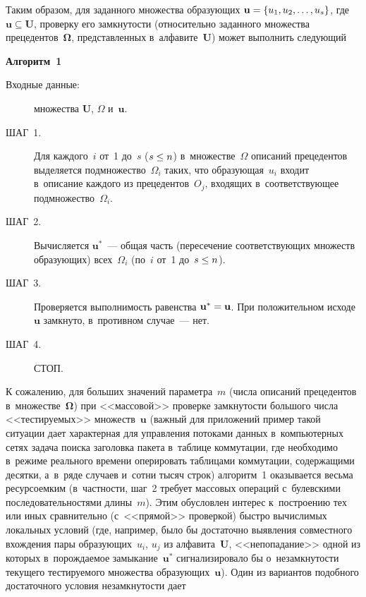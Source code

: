 \begin{multicols}{2}
    Таким образом, для заданного множества образующих 
$\mathbf{u}\hm= \{u_1, u_2, \ldots, u_s\}$, где $\mathbf{u}\subseteq 
\mathbf{U}$, проверку его замкнутости (относительно заданного 
множества прецедентов~$\boldsymbol{\Omega}$, представленных 
в~алфавите~$\mathbf{U}$) может выполнить следующий
    
    \smallskip
    
    \noindent
    \textbf{Алгоритм~1}
        \begin{description}
\item[Входные данные:] множества $\mathbf{U}$, $\Omega$ 
и~$\mathbf{u}$.

\item[ШАГ~1.] Для каждого~$i$ от~1 до~$s$ ($s\hm\leq n$) в~множестве~$\Omega$ 
описаний прецедентов выделяется подмножество~$\Omega_i$ таких, что 
образующая~$u_i$ входит в~описание каждого из прецедентов~$O_j$, 
входящих в~соответствующее подмножество~$\Omega_i$.

\item[ШАГ~2.] Вычисляется $\mathbf{u}^*$~--- общая часть (пересечение 
соответствующих множеств образующих) всех~$\Omega_i$ (по~$i$ от~1 
до~$s\hm\leq n$).

\item[ШАГ~3.] Проверяется выполнимость равенства $\mathbf{u}^*\hm= \mathbf{u}$. При 
положительном исходе~$\mathbf{u}$ замкнуто, в~противном случае~--- 
нет.

\item[ШАГ~4.] СТОП.
\end{description}

\smallskip

    К сожалению, для больших значений па\-ра\-мет\-ра~$m$ (числа описаний 
прецедентов в~множестве~${\boldsymbol{\Omega}}$) при <<массовой>> проверке 
замкнутости большого числа <<тестируемых>> множеств~$\mathbf{u}$
(важный для приложений пример такой ситуации дает характерная для 
управления потоками данных в~компьютерных сетях задача поиска 
заголовка пакета в~таблице коммутации, где необходимо в~режиме реального 
времени оперировать таб\-ли\-ца\-ми коммутации, содержащими десятки, 
а~в~ряде случаев и~сотни тысяч строк) алгоритм~1 оказывается весьма 
ресурсоемким (в~част\-ности, шаг~2 требует массовых операций с~булевскими 
последовательностями длины~$m$). Этим обусловлен интерес к~построению 
тех или иных сравнительно (с~<<прямой>> проверкой) быст\-ро вычислимых 
локальных условий (где, например, было бы достаточно выявления 
совместного вхож\-де\-ния пары образующих~$u_i$, $u_j$ из 
алфавита~$\mathbf{U}$, <<непопадание>> одной из которых 
в~порождаемое замыкание~$\mathbf{u}^*$ сигнализировало бы 
о~незамкнутости текущего тестируемого множества 
образующих~$\mathbf{u}$). Один из вариантов подобного достаточного 
условия незамкнутости дает
    

\end{multicols}
